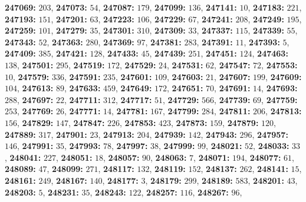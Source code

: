 \textsf{\bfseries 247069:} $203$, \textsf{\bfseries 247073:} $54$, \textsf{\bfseries 247087:} $179$, \textsf{\bfseries 247099:} $136$, \textsf{\bfseries 247141:} $10$, \textsf{\bfseries 247183:} $221$, \textsf{\bfseries 247193:} $151$, \textsf{\bfseries 247201:} $63$, \textsf{\bfseries 247223:} $106$, \textsf{\bfseries 247229:} $67$, \textsf{\bfseries 247241:} $208$, \textsf{\bfseries 247249:} $195$, \textsf{\bfseries 247259:} $101$, \textsf{\bfseries 247279:} $35$, \textsf{\bfseries 247301:} $310$, \textsf{\bfseries 247309:} $33$, \textsf{\bfseries 247337:} $115$, \textsf{\bfseries 247339:} $55$, \textsf{\bfseries 247343:} $52$, \textsf{\bfseries 247363:} $280$, \textsf{\bfseries 247369:} $97$, \textsf{\bfseries 247381:} $283$, \textsf{\bfseries 247391:} $11$, \textsf{\bfseries 247393:} $5$, \textsf{\bfseries 247409:} $385$, \textsf{\bfseries 247421:} $128$, \textsf{\bfseries 247433:} $45$, \textsf{\bfseries 247439:} $251$, \textsf{\bfseries 247451:} $124$, \textsf{\bfseries 247463:} $138$, \textsf{\bfseries 247501:} $295$, \textsf{\bfseries 247519:} $172$, \textsf{\bfseries 247529:} $24$, \textsf{\bfseries 247531:} $62$, \textsf{\bfseries 247547:} $72$, \textsf{\bfseries 247553:} $10$, \textsf{\bfseries 247579:} $336$, \textsf{\bfseries 247591:} $235$, \textsf{\bfseries 247601:} $109$, \textsf{\bfseries 247603:} $21$, \textsf{\bfseries 247607:} $199$, \textsf{\bfseries 247609:} $104$, \textsf{\bfseries 247613:} $89$, \textsf{\bfseries 247633:} $459$, \textsf{\bfseries 247649:} $172$, \textsf{\bfseries 247651:} $70$, \textsf{\bfseries 247691:} $14$, \textsf{\bfseries 247693:} $288$, \textsf{\bfseries 247697:} $22$, \textsf{\bfseries 247711:} $312$, \textsf{\bfseries 247717:} $51$, \textsf{\bfseries 247729:} $566$, \textsf{\bfseries 247739:} $69$, \textsf{\bfseries 247759:} $253$, \textsf{\bfseries 247769:} $26$, \textsf{\bfseries 247771:} $14$, \textsf{\bfseries 247781:} $167$, \textsf{\bfseries 247799:} $284$, \textsf{\bfseries 247811:} $206$, \textsf{\bfseries 247813:} $156$, \textsf{\bfseries 247829:} $147$, \textsf{\bfseries 247847:} $226$, \textsf{\bfseries 247853:} $423$, \textsf{\bfseries 247873:} $159$, \textsf{\bfseries 247879:} $120$, \textsf{\bfseries 247889:} $317$, \textsf{\bfseries 247901:} $23$, \textsf{\bfseries 247913:} $204$, \textsf{\bfseries 247939:} $142$, \textsf{\bfseries 247943:} $296$, \textsf{\bfseries 247957:} $146$, \textsf{\bfseries 247991:} $35$, \textsf{\bfseries 247993:} $78$, \textsf{\bfseries 247997:} $38$, \textsf{\bfseries 247999:} $99$, \textsf{\bfseries 248021:} $52$, \textsf{\bfseries 248033:} $33$, \textsf{\bfseries 248041:} $227$, \textsf{\bfseries 248051:} $18$, \textsf{\bfseries 248057:} $90$, \textsf{\bfseries 248063:} $7$, \textsf{\bfseries 248071:} $194$, \textsf{\bfseries 248077:} $61$, \textsf{\bfseries 248089:} $47$, \textsf{\bfseries 248099:} $271$, \textsf{\bfseries 248117:} $132$, \textsf{\bfseries 248119:} $152$, \textsf{\bfseries 248137:} $262$, \textsf{\bfseries 248141:} $15$, \textsf{\bfseries 248161:} $249$, \textsf{\bfseries 248167:} $140$, \textsf{\bfseries 248177:} $3$, \textsf{\bfseries 248179:} $299$, \textsf{\bfseries 248189:} $583$, \textsf{\bfseries 248201:} $43$, \textsf{\bfseries 248203:} $5$, \textsf{\bfseries 248231:} $35$, \textsf{\bfseries 248243:} $122$, \textsf{\bfseries 248257:} $116$, \textsf{\bfseries 248267:} $96$, 
